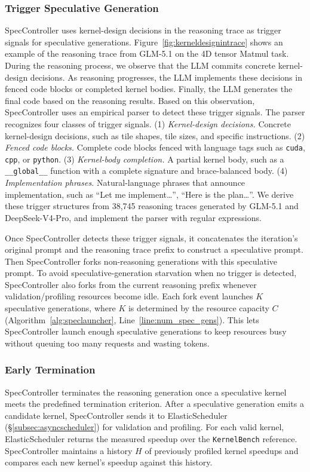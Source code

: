 \subsubsection{Trigger Speculative Generation}\label{subsubsec:dynparser}
SpecController uses kernel-design decisions in the reasoning trace as trigger
signals for speculative generations.
Figure~\ref{fig:kerneldesignintrace} shows an example of the reasoning trace from GLM-5.1 on the 4D tensor Matmul task.
During the reasoning process, we observe that the LLM commits concrete
kernel-design decisions.
As reasoning progresses, the LLM implements these decisions in fenced code
blocks or completed kernel bodies.
Finally, the LLM generates the final code based on the reasoning results.
Based on this observation, SpecController uses an empirical parser to detect
these trigger signals.
The parser recognizes four classes of trigger signals.
(1) \emph{Kernel-design decisions.} Concrete kernel-design decisions, such as tile shapes, tile sizes, and specific instructions.
(2) \emph{Fenced code blocks.} Complete code blocks fenced with language tags such as \texttt{cuda}, \texttt{cpp}, or \texttt{python}.
(3) \emph{Kernel-body completion.} A partial kernel body, such as a \texttt{\_\_global\_\_} function with a complete
signature and brace-balanced body.
(4) \emph{Implementation phrases.} Natural-language phrases that announce implementation, such as ``Let me implement\ldots'', ``Here is the plan\ldots''.
We derive these trigger structures from 38{,}745 reasoning traces generated by
GLM-5.1 and DeepSeek-V4-Pro, and implement the parser with regular expressions.

Once SpecController detects these trigger signals, 
it concatenates the iteration's original prompt and the reasoning trace
prefix to construct a speculative prompt.
Then SpecController forks non-reasoning generations with this speculative prompt.
To avoid speculative-generation starvation when no trigger is detected,
SpecController also forks from the current reasoning prefix whenever
validation/profiling resources become idle.
Each fork event launches $K$ speculative generations, where $K$ is determined by 
the resource capacity $C$ (Algorithm~\ref{alg:speclauncher}, Line~\ref{line:num_spec_gens}).
This lets SpecController launch enough speculative generations to keep resources
busy without queuing too many requests and wasting tokens.

\subsubsection{Early Termination}\label{subsubsec:dispatch}
SpecController terminates the reasoning generation once a speculative
kernel meets the predefined termination criterion.
After a speculative generation emits a candidate kernel, SpecController sends it
to ElasticScheduler (\S\ref{subsec:asyncscheduler}) for validation and profiling.
For each valid kernel, ElasticScheduler returns the measured speedup over the
\texttt{KernelBench} reference.
SpecController maintains a history $H$ of previously profiled kernel speedups
and compares each new kernel's speedup against this history.

